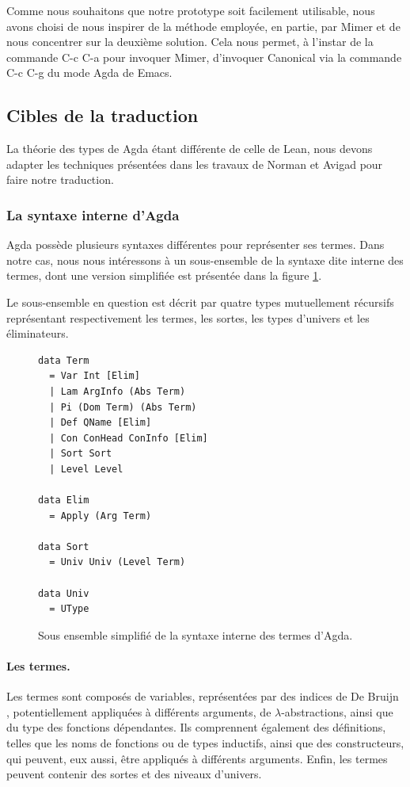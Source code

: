 \documentclass[11pt]{article}
\begin{document}
Comme nous souhaitons que notre prototype soit facilement utilisable, nous avons choisi de nous inspirer de la méthode employée, 
en partie, par Mimer et de nous concentrer sur la deuxième solution.
Cela nous permet, à l'instar de la commande C-c C-a pour invoquer Mimer, d'invoquer Canonical via la commande C-c C-g du mode Agda de Emacs.

\subsection{Cibles de la traduction}
La théorie des types de Agda étant différente de celle de Lean, 
nous devons adapter les techniques présentées dans les travaux de Norman et Avigad \cite{norman2025canonical} pour faire notre traduction.

\subsubsection{La syntaxe interne d'Agda}
Agda possède plusieurs syntaxes différentes pour représenter ses termes. 
Dans notre cas, nous nous intéressons à un sous-ensemble de la syntaxe dite interne des termes, 
dont une version simplifiée est présentée dans la figure \ref{fig:internal}.

Le sous-ensemble en question est décrit par quatre types mutuellement récursifs représentant respectivement les termes, 
les sortes, les types d’univers et les éliminateurs.

\begin{figure}[h]
\centering
\begin{verbatim}
data Term 
  = Var Int [Elim]
  | Lam ArgInfo (Abs Term)
  | Pi (Dom Term) (Abs Term)  
  | Def QName [Elim]              
  | Con ConHead ConInfo [Elim]
  | Sort Sort
  | Level Level

data Elim
  = Apply (Arg Term)

data Sort
  = Univ Univ (Level Term)

data Univ
  = UType

\end{verbatim}
\caption{Sous ensemble simplifié de la syntaxe interne des termes d'Agda.}
\label{fig:internal}
\end{figure}

\paragraph{Les termes.}
Les termes sont composés de variables, représentées par des indices de De Bruijn \cite{de1972lambda}, 
potentiellement appliquées à différents arguments, de $\lambda$-abstractions, ainsi que du type des fonctions dépendantes. 
Ils comprennent également des définitions, telles que les noms de fonctions ou de types inductifs, ainsi que des constructeurs, 
qui peuvent, eux aussi, être appliqués à différents arguments. Enfin, les termes peuvent contenir des sortes et des niveaux d’univers.
\end{document}
